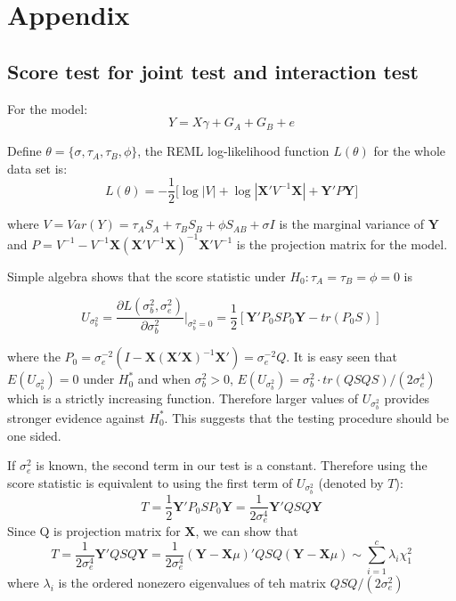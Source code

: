 \documentclass{article}
\newcommand{\Y}{\mathbf{Y}}
\newcommand{\X}{\mathbf{X}}
\begin{document}
    \section{Appendix}

        \subsection{Score test for joint test and interaction test}

            For the model:
            \begin{equation*}
                Y=X\gamma+G_A+G_B+e
            \end{equation*}

            Define $\theta=\{\sigma,\tau_A,\tau_B,\phi\}$, the REML log-likelihood function $L(\theta)$ for the whole data set is:
            \[
                L(\theta)=-\frac{1}{2}\bigg[\log|V|+\log|\X'V^{-1}\X|+\Y'P\Y\bigg]
            \]

             where $V=Var(Y)=\tau_AS_A+\tau_BS_B+\phi S_{AB}+\sigma I$ is the marginal variance of $\Y$ and $P=V^{-1}-V^{-1}\X(\X'V^{-1}\X)^{-1}\X'V^{-1}$ is the projection matrix for the model.

            Simple algebra shows that the score statistic under $H_0:\tau_A=\tau_B=\phi=0$ is

            \[
                U_{\sigma^2_b}=\frac{\partial L(\sigma^2_b,\sigma^2_e)}{\partial \sigma^2_b}\bigg|_{\sigma^2_b=0}=\frac{1}{2}[\Y'P_0SP_0\Y-tr(P_0S)]
            \]

            where the $P_0=\sigma^{-2}_e(I-\X(\X'\X)^{-1}\X')=\sigma^{-2}_eQ$. It is easy seen that $E(U_{\sigma^2_b})=0$ under $H_0^*$ and when $\sigma^2_b>0$, $E(U_{\sigma^2_b})=\sigma^2_b\cdot tr(QSQS)/(2\sigma^4_e)$ which is a strictly increasing function. Therefore larger values of $U_{\sigma_b^2}$ provides stronger evidence against $H_0^*$. This suggests that the testing procedure should be one sided.

            If $\sigma_e^2$ is known, the second term in our test is a constant. Therefore using the score statistic is equivalent to using the first term of $U_{\sigma^2_b}$ (denoted by $T$):
            \[
                T=\frac{1}{2}\Y'P_0SP_0\Y=\frac{1}{2\sigma^4_e}\Y'QSQ\Y
            \]
            Since Q is projection matrix for $\X$, we can show that
            \[
                T=\frac{1}{2\sigma^4_e}\Y'QSQ\Y=\frac{1}{2\sigma^4_e}(\Y-\X\mu)'QSQ(\Y-\X\mu)\sim\sum_{i=1}^c\lambda_i\chi^2_1
            \]
            where $\lambda_i$ is the ordered nonezero eigenvalues of teh matrix $QSQ/(2\sigma^2_e)$
\end{document}
